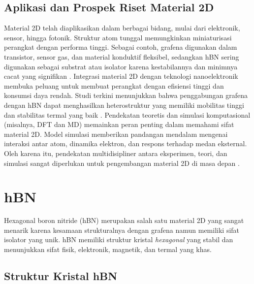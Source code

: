\subsection{Aplikasi dan Prospek Riset Material 2D}
Material 2D telah diaplikasikan dalam berbagai bidang, mulai dari elektronik, sensor, hingga fotonik.
Struktur atom tunggal memungkinkan miniaturisasi perangkat dengan performa tinggi. Sebagai contoh, grafena digunakan dalam transistor, sensor gas, dan material konduktif fleksibel, sedangkan hBN sering digunakan sebagai substrat atau isolator karena kestabilannya dan minimnya cacat yang signifikan \citep{Geim2013}.
Integrasi material 2D dengan teknologi nanoelektronik membuka peluang untuk membuat perangkat dengan efisiensi tinggi dan konsumsi daya rendah.
Studi terkini menunjukkan bahwa penggabungan grafena dengan hBN dapat menghasilkan heterostruktur yang memiliki mobilitas tinggi dan stabilitas termal yang baik \citep{Wang2017}.
Pendekatan teoretis dan simulasi komputasional (misalnya, DFT dan MD) memainkan peran penting dalam memahami sifat material 2D.
Model simulasi memberikan pandangan mendalam mengenai interaksi antar atom, dinamika elektron, dan respons terhadap medan eksternal.
Oleh karena itu, pendekatan multidisipliner antara eksperimen, teori, dan simulasi sangat diperlukan untuk pengembangan material 2D di masa depan \citep{Das2015}.

\section{hBN}

Hexagonal boron nitride (hBN) merupakan salah satu material 2D yang sangat menarik karena kesamaan strukturalnya dengan grafena namun memiliki sifat isolator yang unik.
hBN memiliki struktur kristal \emph{hexagonal} yang stabil dan menunjukkan sifat fisik, elektronik, magnetik, dan termal yang khas.

\subsection{Struktur Kristal hBN}


